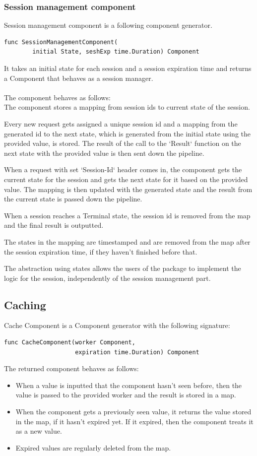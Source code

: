 \documentclass[12pt,a4paper]{article}
\begin{document}
\subsubsection{Session management component}
Session management component is a following component generator.
\begin{lstlisting}
func SessionManagementComponent(
		initial State, seshExp time.Duration) Component
\end{lstlisting}
It takes an initial state for each session and a session expiration time and 
returns a Component that behaves as a session manager. 
\\
\\
The component behaves as follows:
\\
The component stores a mapping from session ids to current state of the session.

Every new request gets assigned a unique session id and a mapping from the generated 
id to the next state, which is generated from the initial state using the provided value,
is stored. The result of the call to the `Result` function on the next state with the provided 
value is then sent down the pipeline.

When a request with set `Session-Id` header comes in, the component gets the current 
state for the session and gets the next state for it based on the provided value.
The mapping is then updated with the generated state and the result from the current state
is passed down the pipeline.

When a session reaches a Terminal state, the session id is removed from the map
and the final result is outputted.

The states in the mapping are timestamped and are removed from the map after
the session expiration time, if they haven't finished before that.

The abstraction using states allows the users of the package to implement the
logic for the session, independently of the session management part.

\subsection{Caching}
Cache Component is a Component generator with the following signature:
\begin{lstlisting}
func CacheComponent(worker Component, 
					expiration time.Duration) Component
\end{lstlisting}
The returned component behaves as follows:
\begin{itemize}
	\item When a value is inputted that the component hasn't seen before, then
				the value is passed to the provided worker and the result is stored in
				a map.
	\item When the component gets a previously seen value, it returns the value
			  stored in the map, if it hasn't expired yet. If it expired, then the component
				treats it as a new value.
	\item Expired values are regularly deleted from the map.
\end{itemize}
\end{document}
